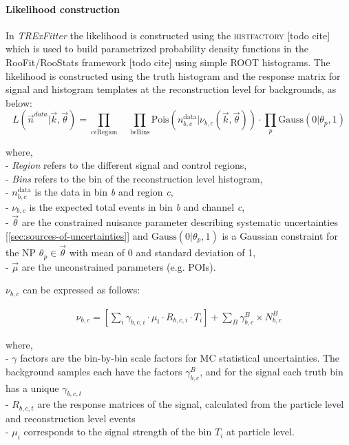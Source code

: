 \paragraph{Likelihood construction}
In \emph{TRExFitter} the likelihood is constructed using the \textsc{histfactory} [todo cite] which is used to build parametrized probability density functions in the RooFit/RooStats framework [todo cite] using simple ROOT histograms. The likelihood is constructed using the truth histogram and the response matrix for signal and histogram templates at the reconstruction level for backgrounds, as below:
\begin{equation}\label{eq:likelihodd-defn}
	L(\vec{n}^{data} | \vec{k}, \vec{\theta}) = \prod_{\mathrm{c} \epsilon \mathrm{Region}} \quad \prod_{\mathrm{b} \epsilon \mathrm{Bins}} \mathrm{Pois} (n^{\mathrm{data}}_{b,c}|\nu_{b,c}(\vec{k}, \Vec{\theta})) \cdot \prod_{p} \mathrm{Gauss}(0|\theta_{p},1)
\end{equation}

where,\\ 
- \textit{Region} refers to the different signal and control regions,\\
- \textit{Bins} refers to the bin of the reconstruction level histogram,\\
- $n^{\mathrm{data}}_{b,c}$ is the data in bin \textit{b} and region \textit{c}, \\
- $\nu_{b,c}$ is the expected total events in bin \textit{b} and channel \textit{c}, \\
- $\Vec{\theta}$ are the constrained nuisance parameter describing systematic uncertainties [\ref{sec:sources-of-uncertainties}] and $\mathrm{Gauss}(0|\theta_p,1)$ is a Gaussian constraint for the NP $\theta_p \in \vec{\theta}$ with mean of 0 and standard deviation of 1,\\
- $\vec{\mu}$ are the unconstrained parameters (e.g. POIs).

$\nu_{b,c}$ can be expressed as follows:

\begin{align}\label{eq:likelihodd-defn-1}
    \nu_{b,c} = \left[\sum_i \gamma_{b,c,i} \cdot \mu_{i} \cdot R_{b,c,i} \cdot T_{i}\right] + \sum_{B} \gamma_{b,c}^{B} \times N_{b,c}^{B} 
\end{align}

where, \\
- $\gamma$ factors are the bin-by-bin scale factors for MC statistical uncertainties. The background samples each have the factors $\gamma_{b,c}^{B}$, and for the signal each truth bin has a unique $\gamma_{b,c,t}$\\
- $R_{b,c,t}$ are the response matrices of the signal, calculated from the particle level and reconstruction level events \\
- $\mu_{i}$ corresponds to the signal strength of the bin $T_{i}$ at particle level.

